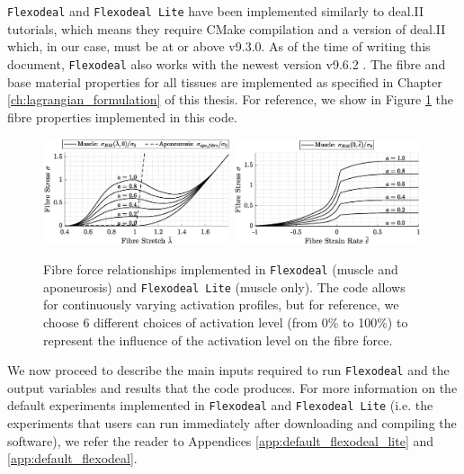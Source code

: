 \documentclass{sfuthesis}
\numberwithin{equation}{section}
\numberwithin{figure}{chapter}
\numberwithin{table}{chapter}
\theoremstyle{definition}
\begin{document}
\texttt{Flexodeal} and \texttt{Flexodeal Lite} have been implemented similarly to deal.II tutorials, which means they require CMake compilation and a version of deal.II which, in our case, must be at or above v9.3.0. As of the time of writing this document, \texttt{Flexodeal} also works with the newest version v9.6.2 \cite{dealii962}. The fibre and base material properties for all tissues are implemented as specified in Chapter \ref{ch:lagrangian_formulation} of this thesis. For reference, we show in Figure \ref{fig:FL_curves_diff_act} the fibre properties implemented in this code.

\begin{figure}
    \centering
    \includegraphics[width=0.49\textwidth]{fibre-FL-diff-a.eps}
    \includegraphics[width=0.49\textwidth]{fibre-FV-diff-a.eps}
    \caption{Fibre force relationships implemented in \texttt{Flexodeal} (muscle and aponeurosis) and \texttt{Flexodeal Lite} (muscle only). The code allows for continuously varying activation profiles, but for reference, we choose 6 different choices of activation level (from 0\% to 100\%) to represent the influence of the activation level on the fibre force. 
    \label{fig:FL_curves_diff_act}}
\end{figure}

We now proceed to describe the main inputs required to run \texttt{Flexodeal} and the output variables and results that the code produces. For more information on the default experiments implemented in \texttt{Flexodeal} and \texttt{Flexodeal Lite} (i.e. the experiments that users can run immediately after downloading and compiling the software), we refer the reader to Appendices \ref{app:default_flexodeal_lite} and  \ref{app:default_flexodeal}.
\end{document}
